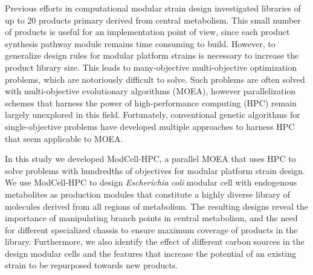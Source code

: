 Previous efforts in computational modular strain design investigated libraries of up to 20 products primary derived from central metabolism.\citep{garcia2019,garcia2019d}
This small number of products is useful for an implementation point of view,  since each product synthesis pathway module remains time consuming to build. However, to generalize design rules for modular platform strains is necessary to increase the product library size.
This leads to many-objective multi-objective optimization problems, which are notoriously difficult to solve.\citep{ishibuchi2008, li2018}  %
Such problems are often solved with multi-objective evolutionary algorithms (MOEA), however parallelization schemes that harness the power of high-performance computing (HPC) remain largely unexplored in this field.
Fortunately, conventional genetic algorithms for single-objective problems have developed multiple approaches to harness HPC \citep{alba2013} that seem applicable to MOEA.\citep{martens2013, jozefowiez2005, garcia2016}


In this study we developed ModCell-HPC, a parallel MOEA that uses HPC to solve problems with hundredths of objectives for modular platform strain design.
We use ModCell-HPC to design \textit{Escherichia coli} modular cell with endogenous metabolites as production modules that constitute
a highly diverse library of molecules derived from all regions of metabolism.
The resulting designs reveal the importance of manipulating branch points in central metabolism, and the need for different specialized chassis to ensure maximum coverage of products in the library. %
Furthermore, we also identify the effect of different carbon sources in the design modular cells and the features that increase the potential of an existing strain to be repurposed towards new products.

